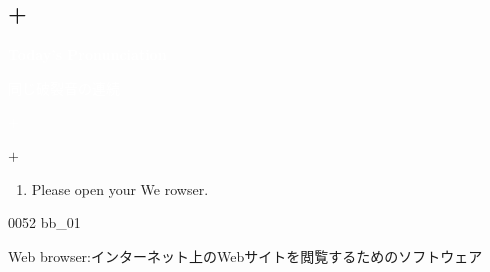 \documentclass[aspectratio=169,xcolor={dvipsnames,table}]{beamer}
\begin{document}
\subsection{+}
\begin{frame}
  \centering
  \textcolor{white}{\Huge\bfseries Today's Pronunciation}

  \vspace{30pt}

  \textcolor{white}{\Large 同じ破裂音の連続}

  \textcolor{white}{\Large {} $+$ }

\end{frame}
\begin{frame}[plain]{ $+$ }
  \Large

  \begin{enumerate}
    \item Please open your We  rowser. 
  \end{enumerate}
  \bigskip




  \hfill{}

  \hfill{\tiny 0052}\,{\scriptsize {}\,bb\_01}

  {\small Web browser:インターネット上のWebサイトを閲覧するためのソフトウェア}
\end{frame}
\end{document}
